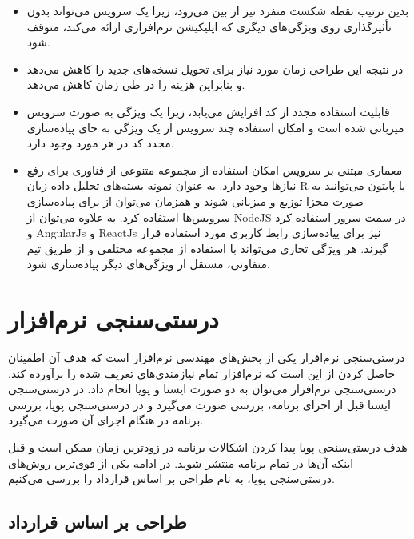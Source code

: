 \begin{itemize}
\item
بدین ترتیب نقطه شکست منفرد نیز از بین می‌رود، زیرا یک سرویس می‌تواند بدون تأثیرگذاری روی ویژگی‌های دیگری که اپلیکیشن نرم‌افزاری ارائه می‌کند، متوقف شود.

\item
در نتیجه این طراحی زمان مورد نیاز برای تحویل نسخه‌های جدید را کاهش می‌دهد و بنابراین هزینه را در طی زمان کاهش می‌دهد.

\item
قابلیت استفاده مجدد از کد افزایش می‌یابد، زیرا یک ویژگی به صورت سرویس میزبانی شده است و امکان استفاده چند سرویس از یک ویژگی به جای پیاده‌سازی مجدد کد در هر مورد وجود دارد.

\item
معماری مبتنی بر سرویس امکان استفاده از مجموعه متنوعی از فناوری برای رفع نیازها وجود دارد. به عنوان نمونه بسته‌های تحلیل داده زبان R یا پایتون می‌توانند به صورت مجزا توزیع و میزبانی شوند و همزمان می‌توان از 
برای پیاده‌سازی سرویس‌ها استفاده کرد. به علاوه می‌توان از NodeJS در سمت سرور استفاده کرد و AngularJs و ReactJs نیز برای پیاده‌سازی رابط کاربری مورد استفاده قرار گیرند. هر ویژگی تجاری می‌تواند با استفاده از مجموعه مختلفی و از طریق تیم متفاوتی، مستقل از ویژگی‌های دیگر پیاده‌سازی شود.

\end{itemize}


\section{درستی‌سنجی نرم‌افزار}
درستی‌سنجی نرم‌افزار یکی از بخش‌های مهندسی نرم‌افزار است که هدف آن اطمینان حاصل کردن از این است که نرم‌افزار تمام نیازمندی‌های تعریف شده را برآورده کند. درستی‌سنجی نرم‌افزار می‌توان به دو صورت ایستا و پویا انجام داد. در درستی‌سنجی ایستا قبل از اجرای برنامه، بررسی صورت می‌گیرد و در درستی‌سنجی پویا، بررسی برنامه در هنگام اجرای آن صورت می‌گیرد. 

هدف درستی‌سنجی پویا پیدا کردن اشکالات برنامه در زودترین زمان ممکن است و قبل اینکه آن‌ها در تمام برنامه منتشر شوند. در ادامه یکی از قوی‌ترین روش‌های درستی‌سنجی پویا، به نام طراحی بر اساس قرارداد را بررسی می‌کنیم.

\subsection{طراحی بر اساس قرارداد}

